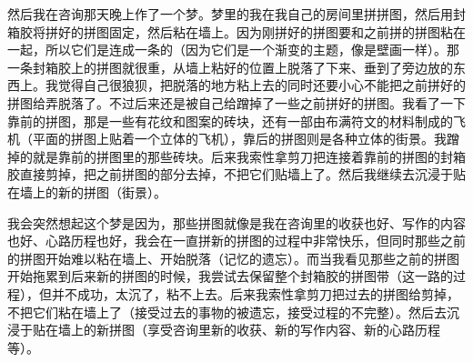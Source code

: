 然后我在咨询那天晚上作了一个梦。梦里的我在我自己的房间里拼拼图，然后用封箱胶将拼好的拼图固定，然后粘在墙上。因为刚拼好的拼图要和之前拼的拼图粘在一起，所以它们是连成一条的（因为它们是一个渐变的主题，像是壁画一样）。那一条封箱胶上的拼图就很重，从墙上粘好的位置上脱落了下来、垂到了旁边放的东西上。我觉得自己很狼狈，把脱落的地方粘上去的同时还要小心不能把之前拼好的拼图给弄脱落了。不过后来还是被自己给蹭掉了一些之前拼好的拼图。我看了一下靠前的拼图，那是一些有花纹和图案的砖块，还有一部由布满符文的材料制成的飞机（平面的拼图上贴着一个立体的飞机），靠后的拼图则是各种立体的街景。我蹭掉的就是靠前的拼图里的那些砖块。后来我索性拿剪刀把连接着靠前的拼图的封箱胶直接剪掉，把之前拼图的部分去掉，不把它们贴墙上了。然后我继续去沉浸于贴在墙上的新的拼图（街景）。

我会突然想起这个梦是因为，那些拼图就像是我在咨询里的收获也好、写作的内容也好、心路历程也好，我会在一直拼新的拼图的过程中非常快乐，但同时那些之前的拼图开始难以粘在墙上、开始脱落（记忆的遗忘）。而当我看见那些之前的拼图开始拖累到后来新的拼图的时候，我尝试去保留整个封箱胶的拼图带（这一路的过程），但并不成功，太沉了，粘不上去。后来我索性拿剪刀把过去的拼图给剪掉，不把它们粘在墙上了（接受过去的事物的被遗忘，接受过程的不完整）。然后去沉浸于贴在墙上的新拼图（享受咨询里新的收获、新的写作内容、新的心路历程等）。

